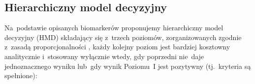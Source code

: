


\subsection{Hierarchiczny model decyzyjny}

Na~podstawie opisanych biomarkerów proponujemy hierarchiczny
model decyzyjny (HMD) składający się z~trzech poziomów,
zorganizowanych zgodnie z~zasadą proporcjonalności
, każdy kolejny poziom jest bardziej kosztowny analitycznie
i~stosowany wyłącznie wtedy, gdy poprzedni nie~daje
jednoznacznego wyniku lub~gdy wynik Poziomu~I jest
pozytywny (tj.~kryteria są spełnione):




